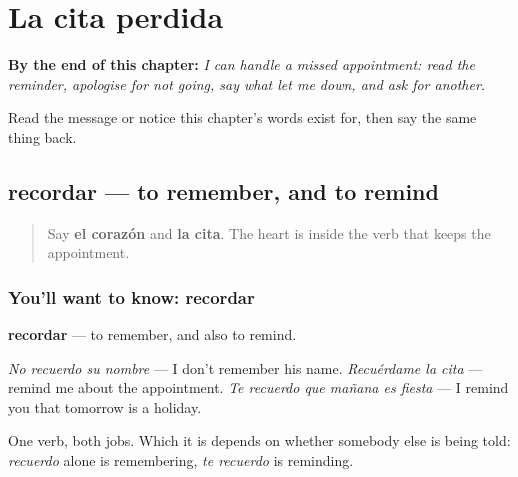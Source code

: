 
\chapter{La cita perdida}
\label{ch:es-cita}

\begin{chapteropening}
\textbf{By the end of this chapter:} \emph{I can handle a missed appointment: read the reminder, apologise for not going, say what let me down, and ask for another.}

Read the message or notice this chapter's words exist for, then say the same thing back.
\end{chapteropening}

\section[recordar]{recordar — to remember, and to remind}

\label{lesson:ES-C464-recordar}



\begin{quote}
Say \textbf{el corazón} and \textbf{la cita}. The heart is inside the verb that keeps the appointment.
\end{quote}

\subsection*{You'll want to know: recordar}
\textbf{recordar} — to remember, and also to remind.

\emph{No recuerdo su nombre} — I don't remember his name. \emph{Recuérdame la cita} — remind me about the appointment. \emph{Te recuerdo que mañana es fiesta} — I remind you that tomorrow is a holiday.

One verb, both jobs. Which it is depends on whether somebody else is being told: \emph{recuerdo} alone is remembering, \emph{te recuerdo} is reminding.

